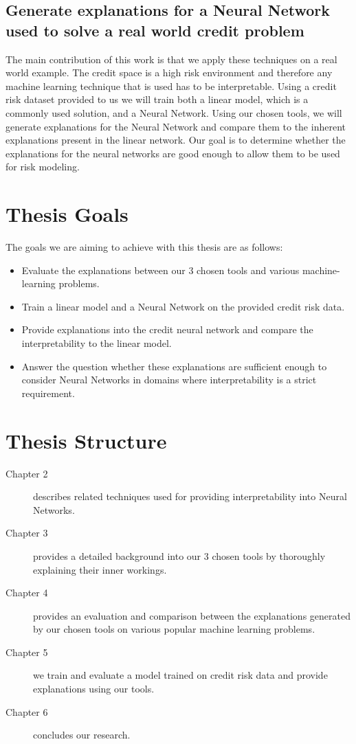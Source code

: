 \subsection{Generate explanations for a Neural Network used to solve a real world credit problem}
The main contribution of this work is that we apply these techniques on a real world example. The credit space is a high risk environment and therefore any machine learning technique that is used has to be interpretable. Using a credit risk dataset provided to us we will train both a linear model, which is a commonly used solution, and a Neural Network. Using our chosen tools, we will generate explanations for the Neural Network and compare them to the inherent explanations present in the linear network. Our goal is to determine whether the explanations for the neural networks are good enough to allow them to be used for risk modeling.

\section{Thesis Goals}
The goals we are aiming to achieve with this thesis are as follows:
\begin{itemize}
    \item Evaluate the explanations between our 3 chosen tools and various machine-learning problems.
    \item Train a linear model and a Neural Network on the provided credit risk data.
    \item Provide explanations into the credit neural network and compare the interpretability to the linear model.
    \item Answer the question whether these explanations are sufficient enough to consider Neural Networks in domains where interpretability is a strict requirement.
\end{itemize}
\section{Thesis Structure}
\begin{description}
 \item[Chapter 2] describes related techniques used for providing interpretability into Neural Networks.
 \item[Chapter 3] provides a detailed background into our 3 chosen tools by thoroughly explaining their inner workings.
 \item[Chapter 4] provides an evaluation and comparison between the explanations generated by our chosen tools on various popular machine learning problems.
 \item[Chapter 5] we train and evaluate a model trained on credit risk data and provide explanations using our tools.
 \item[Chapter 6] concludes our research.
\end{description}